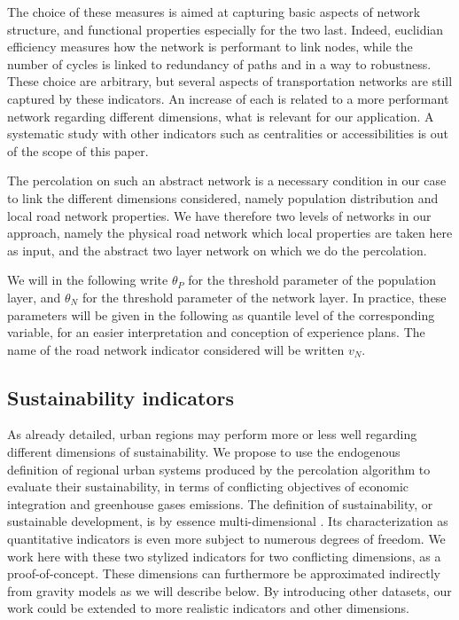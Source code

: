 \documentclass{jimis-en}
\begin{document}
The choice of these measures is aimed at capturing basic aspects of network structure, and functional properties especially for the two last. Indeed, euclidian efficiency measures how the network is performant to link nodes, while the number of cycles is linked to redundancy of paths and in a way to robustness. These choice are arbitrary, but several aspects of transportation networks are still captured by these indicators. An increase of each is related to a more performant network regarding different dimensions, what is relevant for our application. A systematic study with other indicators such as centralities or accessibilities is out of the scope of this paper.



The percolation on such an abstract network is a necessary condition in our case to link the different dimensions considered, namely population distribution and local road network properties. We have therefore two levels of networks in our approach, namely the physical road network which local properties are taken here as input, and the abstract two layer network on which we do the percolation.

We will in the following write $\theta_P$ for the threshold parameter of the population layer, and $\theta_N$ for the threshold parameter of the network layer. In practice, these parameters will be given in the following as quantile level of the corresponding variable, for an easier interpretation and conception of experience plans. The name of the road network indicator considered will be written $v_N$.


\subsection{Sustainability indicators}


As already detailed, urban regions may perform more or less well regarding different dimensions of sustainability. We propose to use the endogenous definition of regional urban systems produced by the percolation algorithm to evaluate their sustainability, in terms of conflicting objectives of economic integration and greenhouse gases emissions. The definition of sustainability, or sustainable development, is by essence multi-dimensional \citep{viguie2012trade}. Its characterization as quantitative indicators is even more subject to numerous degrees of freedom. We work here with these two stylized indicators for two conflicting dimensions, as a proof-of-concept. These dimensions can furthermore be approximated indirectly from gravity models as we will describe below. By introducing other datasets, our work could be extended to more realistic indicators and other dimensions.
\end{document}
